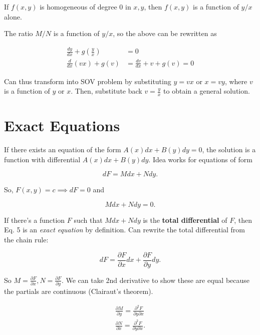 \begin{corollary}
    If $f(x,y)$ is homogeneous of degree 0 in $x,y$, then $f(x,y)$ is a function of $y/x$ alone.
\end{corollary}

The ratio $M/N$ is a function of $y/x$, so the above can be rewritten as

\begin{align}
    \frac{dy}{dx}+g(\frac{y}{x})&=0\\
    \frac{d}{dx}(vx)+g(v)&=\frac{dv}{dx}+v+g(v)=0
\end{align}
    
Can thus transform into SOV problem by substituting $y=vx$ or $x=vy$, where $v$ is a function of $y$ or $x$.
Then, substitute back $v=\frac{y}{x}$ to obtain a general solution.

\section{Exact Equations}

If there exists an equation of the form $A(x)dx+B(y)dy=0$, the solution is a function with differential $A(x)dx+B(y)dy$.
Idea works for equations of form

\begin{equation}
    dF=Mdx+Ndy.
\end{equation}

So, $F(x,y)=c\implies dF=0$ and

\begin{equation}
    Mdx+Ndy=0.
\end{equation}

If there's a function $F$ such that $Mdx+Ndy$ is the \textbf{total differential}
of $F$, then Eq. 5 is an \textit{exact equation} by definition. Can rewrite the total differential from the chain rule:

\begin{equation}
    dF=\frac{\partial F}{\partial x}dx+\frac{\partial F}{\partial y}dy.
\end{equation}

So $M=\frac{\partial F}{\partial x},N=\frac{\partial F}{\partial y}$. We can take 2nd derivative to show these are equal because the partials are continuous (Clairaut's theorem).

\begin{eqnarray}
    \frac{\partial M}{\partial y}=\frac{\partial^2 F}{\partial y\partial x}\\
    \frac{\partial N}{\partial x}=\frac{\partial^2 F}{\partial y\partial x}.
\end{eqnarray}

